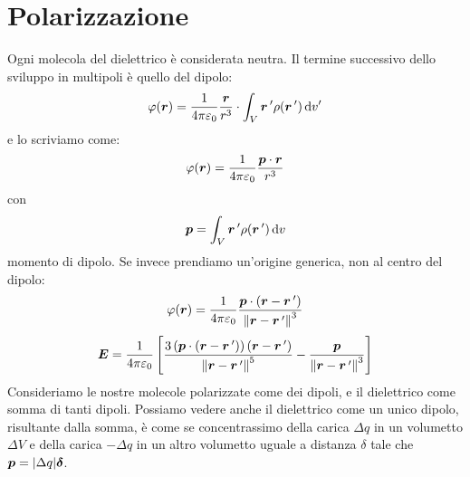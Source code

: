 \section{Polarizzazione}
Ogni molecola del dielettrico è considerata neutra. Il termine successivo dello sviluppo in multipoli è quello del dipolo:
\begin{equation}
  \varphi(\boldsymbol{r})=\frac{1}{4\pi\varepsilon_0}\frac{\boldsymbol{r}}{r^3}\cdot\int_V\boldsymbol{r}\,'\rho(\boldsymbol{r}\,')\,\mathrm{d} v'
\end{equation}
e lo scriviamo come:
\begin{equation}
  \varphi(\boldsymbol{r})=\frac{1}{4\pi\varepsilon_0}\frac{\boldsymbol{p}\cdot\boldsymbol{r}}{r^3}
\end{equation}
con
\begin{equation}
  \boldsymbol{p}=\int_V \boldsymbol{r}\,'\rho(\boldsymbol{r}\,')\,\mathrm{d} v
\end{equation}
momento di dipolo. Se invece prendiamo un'origine generica, non al centro del dipolo:
\begin{equation}
  \varphi(\boldsymbol{r})=\frac{1}{4\pi\varepsilon_0}\frac{\boldsymbol{p}\cdot\left(\boldsymbol{r}-\boldsymbol{r}\,'\right)}{\left\lVert\boldsymbol{r}-\boldsymbol{r}\,'\right\rVert^3}
  \label{dipolo_scentrato}
\end{equation}
\begin{equation}
  \boldsymbol{E}=\frac{1}{4\pi\varepsilon_0}\left[\frac{3\left(\boldsymbol{p}\cdot\left(\boldsymbol{r}-\boldsymbol{r}\,'\right)\right)\left(\boldsymbol{r}-\boldsymbol{r}\,'\right)}{{\left\lVert\boldsymbol{r}-\boldsymbol{r}\,'\right\rVert}^5}-\frac{\boldsymbol{p}}{{\left\lVert\boldsymbol{r}-\boldsymbol{r}\,'\right\rVert}^3}\right]
\end{equation}
Consideriamo le nostre molecole polarizzate come dei dipoli, e il dielettrico come somma di tanti dipoli. Possiamo vedere anche il dielettrico come un unico dipolo, risultante dalla somma, è come se concentrassimo della carica $\Delta q$ in un volumetto $\Delta V$ e della carica $-\Delta q$ in un altro volumetto uguale a distanza $\delta$ tale che $\boldsymbol{p}=|\Delta q|\boldsymbol{\delta}$.

